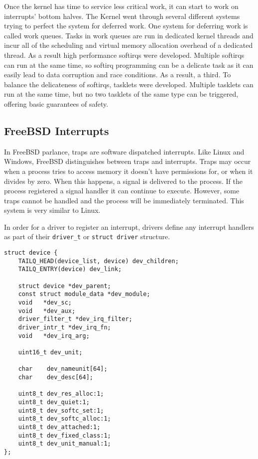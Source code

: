 \documentclass[10pt,conference,draftclsnofoot,onecolumn]{IEEEtran}
\begin{document}
Once the kernel has time to service less critical work, it can start to work on interrupts' bottom halves. The Kernel went through several different systems trying to perfect the system for deferred work. One system for deferring work is called work queues. Tasks in work queues are run in dedicated kernel threads and incur all of the scheduling and virtual memory allocation overhead of a dedicated thread. As a result high performance softirqs were developed. Multiple softirqs can run at the same time, so softirq programming can be a delicate task as it can easily lead to data corruption and race conditions. As a result, a third. To balance the delicateness of softirqs, tasklets were developed. Multiple tasklets can run at the same time, but no two tasklets of the same type can be triggered, offering basic guarantees of safety\cite{1_love_2010}.

\subsection{FreeBSD Interrupts}
In FreeBSD parlance, traps are software dispatched interrupts. Like Linux and Windows, FreeBSD distinguishes between traps and interrupts. Traps may occur when a process tries to access memory it doesn't have permissions for, or when it divides by zero. When this happens, a signal is delivered to the process. If the process registered a signal handler it can continue to execute. However, some traps cannot be handled and the process will be immediately terminated. This system is very similar to Linux\cite{3_mckusick_neville-neil_watson_2015}.

In order for a driver to register an interrupt, drivers define any interrupt handlers as part of their \texttt{driver\_t} or \texttt{struct driver} structure\cite{freebsd_2016}.

\begin{lstlisting}
struct device {
	TAILQ_HEAD(device_list, device) dev_children;
	TAILQ_ENTRY(device) dev_link;

	struct device *dev_parent;
	const struct module_data *dev_module;
	void   *dev_sc;
	void   *dev_aux;
	driver_filter_t *dev_irq_filter;
	driver_intr_t *dev_irq_fn;
	void   *dev_irq_arg;

	uint16_t dev_unit;

	char	dev_nameunit[64];
	char	dev_desc[64];

	uint8_t	dev_res_alloc:1;
	uint8_t	dev_quiet:1;
	uint8_t	dev_softc_set:1;
	uint8_t	dev_softc_alloc:1;
	uint8_t	dev_attached:1;
	uint8_t	dev_fixed_class:1;
	uint8_t	dev_unit_manual:1;
};
\end{lstlisting}
\end{document}
